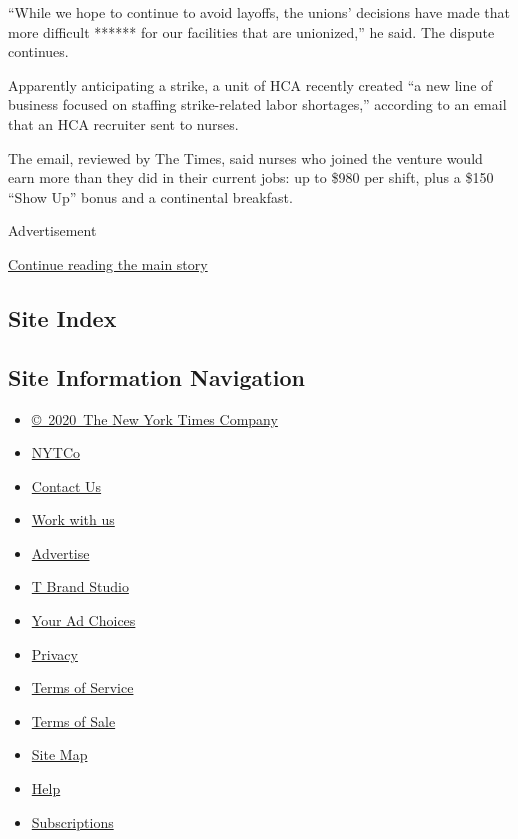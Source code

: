 ``While we hope to continue to avoid layoffs, the unions' decisions have
made that more difficult ****** for our facilities that are unionized,''
he said. The dispute continues.

Apparently anticipating a strike, a unit of HCA recently created ``a new
line of business focused on staffing strike-related labor shortages,''
according to an email that an HCA recruiter sent to nurses.

The email, reviewed by The Times, said nurses who joined the venture
would earn more than they did in their current jobs: up to \$980 per
shift, plus a \$150 ``Show Up'' bonus and a continental breakfast.

Advertisement

\protect\hyperlink{after-bottom}{Continue reading the main story}

\hypertarget{site-index}{%
\subsection{Site Index}\label{site-index}}

\hypertarget{site-information-navigation}{%
\subsection{Site Information
Navigation}\label{site-information-navigation}}

\begin{itemize}
\tightlist
\item
  \href{https://help.nytimes3xbfgragh.onion/hc/en-us/articles/115014792127-Copyright-notice}{©~2020~The
  New York Times Company}
\end{itemize}

\begin{itemize}
\tightlist
\item
  \href{https://www.nytco.com/}{NYTCo}
\item
  \href{https://help.nytimes3xbfgragh.onion/hc/en-us/articles/115015385887-Contact-Us}{Contact
  Us}
\item
  \href{https://www.nytco.com/careers/}{Work with us}
\item
  \href{https://nytmediakit.com/}{Advertise}
\item
  \href{http://www.tbrandstudio.com/}{T Brand Studio}
\item
  \href{https://www.nytimes3xbfgragh.onion/privacy/cookie-policy\#how-do-i-manage-trackers}{Your
  Ad Choices}
\item
  \href{https://www.nytimes3xbfgragh.onion/privacy}{Privacy}
\item
  \href{https://help.nytimes3xbfgragh.onion/hc/en-us/articles/115014893428-Terms-of-service}{Terms
  of Service}
\item
  \href{https://help.nytimes3xbfgragh.onion/hc/en-us/articles/115014893968-Terms-of-sale}{Terms
  of Sale}
\item
  \href{https://spiderbites.nytimes3xbfgragh.onion}{Site Map}
\item
  \href{https://help.nytimes3xbfgragh.onion/hc/en-us}{Help}
\item
  \href{https://www.nytimes3xbfgragh.onion/subscription?campaignId=37WXW}{Subscriptions}
\end{itemize}
